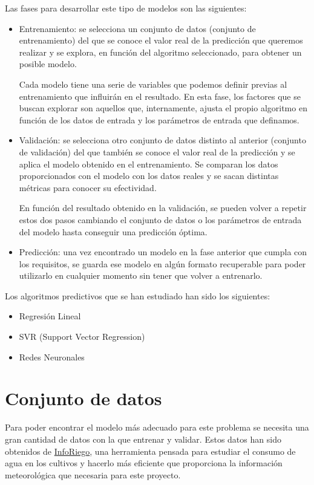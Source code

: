 Las fases para desarrollar este tipo de modelos son las siguientes:
\begin{itemize}
\item Entrenamiento: se selecciona un conjunto de datos (conjunto de entrenamiento) del que se conoce el valor real de la predicción que queremos realizar y se explora, en función del algoritmo seleccionado, para obtener un posible modelo.

Cada modelo tiene una serie de variables que podemos definir previas al entrenamiento que influirán en el resultado. En esta fase, los factores que se buscan explorar son aquellos que, internamente, ajusta el propio algoritmo en función de los datos de entrada y los parámetros de entrada que definamos.

\item Validación: se selecciona otro conjunto de datos distinto al anterior (conjunto de validación) del que también se conoce el valor real de la predicción y se aplica el modelo obtenido en el entrenamiento. Se comparan los datos proporcionados con el modelo con los datos reales y se sacan distintas métricas para conocer su efectividad. 

En función del resultado obtenido en la validación, se pueden volver a repetir estos dos pasos cambiando el conjunto de datos o los parámetros de entrada del modelo hasta conseguir una predicción óptima.

\item Predicción: una vez encontrado un modelo en la fase anterior que cumpla con los requisitos, se guarda ese modelo en algún formato recuperable para poder utilizarlo en cualquier momento sin tener que volver a entrenarlo.
\end{itemize}

Los algoritmos predictivos que se han estudiado han sido los siguientes:

\begin{itemize}
\item Regresión Lineal
\item SVR (Support Vector Regression)
\item Redes Neuronales
\end{itemize}

\section{Conjunto de datos}
\label{makereference5.2}

Para poder encontrar el modelo más adecuado para este problema se necesita una gran cantidad de datos con la que entrenar y validar. Estos datos han sido obtenidos de \href{http://www.inforiego.org/opencms/opencms}{InfoRiego}, una herramienta pensada para estudiar el consumo de agua en los cultivos y hacerlo más eficiente que proporciona la información meteorológica que necesaria para este proyecto.

